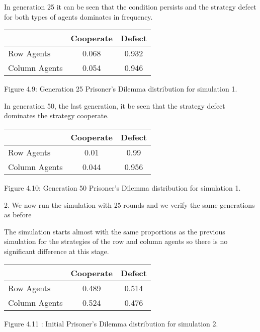 \documentclass{article}
\begin{document}
In generation 25 it can be seen that the condition persists and the strategy defect for both types of agents dominates in frequency.
\begin{center}
\begin{tabular}{|l|c|c|}
\hline
& Cooperate & Defect \\ 
\hline
Row Agents & 0.068 & 0.932\\
\hline
Column Agents & 0.054 & 0.946\\
\hline
\end{tabular}
\end{center}
\begin{center}
Figure 4.9: Generation 25 Prisoner’s Dilemma distribution for simulation 1.
\end{center}


In generation 50, the last generation, it be seen that the strategy defect dominates the strategy cooperate.
\begin{center}
\begin{tabular}{|l|c|c|}
\hline
& Cooperate & Defect \\ 
\hline
Row Agents & 0.01 & 0.99\\
\hline
Column Agents & 0.044 & 0.956\\
\hline
\end{tabular}
\end{center}
\begin{center}
Figure 4.10: Generation 50 Prisoner’s Dilemma distribution for simulation 1.
\end{center}

2. We now run the simulation with 25 rounds and we verify the same generations as before

The simulation starts almost with the same proportions as the previous simulation for the strategies of the row and column agents so there is no significant difference at this stage.
\begin{center}
\begin{tabular}{|l|c|c|}
\hline
& Cooperate & Defect \\ 
\hline
Row Agents & 0.489 & 0.514\\
\hline
Column Agents & 0.524 & 0.476\\
\hline
\end{tabular}
\end{center}
\begin{center}
Figure 4.11 : Initial Prisoner’s Dilemma distribution for simulation 2.
\end{center}
\end{document}
